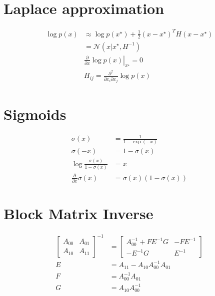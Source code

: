 \documentclass[a4paper]{scrartcl}
\begin{document}
\section{Laplace approximation}
\begin{align}
    \log p(x) 
        &\approx \log p(x^\star) + \frac{1}{2} \left(x - x^\star \right)^T H \left(x - x^\star\right) \\
        &= \mathcal{N}(x|x^\star, H^{-1}) \\
    &\left. \frac{\partial}{\partial x} \log p(x) \right|_{x^\star} = 0 \\
    &H_{ij} = \frac{\partial^2}{\partial x_i \partial x_j} \log p(x) 
\end{align}

\section{Sigmoids}
\begin{align}
    \sigma(x) &= \frac{1}{1 - \exp(-x)} \\
    \sigma(-x) &= 1 - \sigma(x)  \\
    \log \frac{\sigma(x)}{1 - \sigma(x)} &= x \\
    \frac{\partial}{\partial x}\sigma(x) &= \sigma(x) (1 - \sigma(x))
\end{align}

\section{Block Matrix Inverse}
\begin{align}
    \begin{bmatrix} 
            A_{00} & A_{01} \\ 
            A_{10} & A_{11} 
    \end{bmatrix}^{-1} 
    &= \begin{bmatrix} 
        A_{00}^{-1} + F E^{-1} G & -F E^{-1} \\ 
        -E^{-1} G & E^{-1} 
    \end{bmatrix} \\
    E &= A_{11} - A_{10} A_{00}^{-1} A_{01} \\
    F &= A_{00}^{-1}A_{01} \\
    G &= A_{10} A_{00}^{-1}
\end{align}
\end{document}
